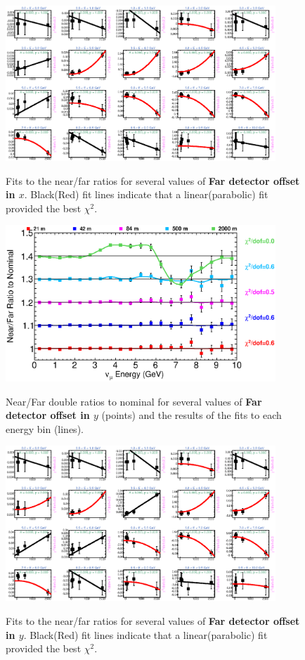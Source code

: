 \begin{figure}[hb]
  \begin{center}
    {\includegraphics[width=4.0in]{figures/LBNEFDX_nof_fits.eps}}
  \end{center}
\caption{ Fits to the near/far ratios for several values of {\bf Far detector offset in $x$}. Black(Red) fit lines indicate that a linear(parabolic) fit provided the best $\chi^2$. }
\end{figure}

\begin{figure}[ht]
  \begin{center}
    {\includegraphics[width=4.0in]{figures/LBNEFDY_nof_summary.eps}}
  \end{center}
\caption{ Near/Far double ratios to nominal for several values of {\bf Far detector offset in $y$} (points) and the results of the fits to each energy bin (lines).}
\end{figure}

\begin{figure}[hb]
  \begin{center}
    {\includegraphics[width=4.0in]{figures/LBNEFDY_nof_fits.eps}}
  \end{center}
\caption{ Fits to the near/far ratios for several values of {\bf Far detector offset in $y$}. Black(Red) fit lines indicate that a linear(parabolic) fit provided the best $\chi^2$. }
\end{figure}

